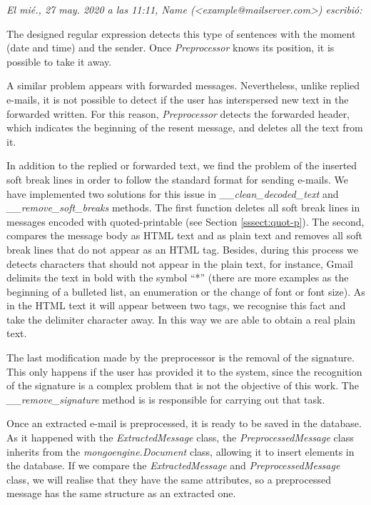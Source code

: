 \textit{El mié., 27 may. 2020 a las 11:11, Name (<example@mailserver.com>) escribió:}

The designed regular expression detects this type of sentences with the moment (date and time) and the sender. Once \textit{Preprocessor} knows its position, it is possible to take it away.

A similar problem appears with forwarded messages. Nevertheless, unlike replied e-mails, it is not possible to detect if the user has interspersed new text in the forwarded written. For this reason, \textit{Preprocessor} detects the forwarded header, which indicates the beginning of the resent message, and deletes all the text from it.

In addition to the replied or forwarded text, we find the problem of the inserted soft break lines in order to follow the standard format for sending e-mails. We have implemented two solutions for this issue in \textit{\_\_clean\_decoded\_text} and \textit{\_\_remove\_soft\_breaks} methods. The first function deletes all soft break lines in messages encoded with quoted-printable (see Section \ref{sssect:quot-p}). The second, compares the message body as HTML text and as plain text and removes all soft break lines that do not appear as an HTML tag. Besides, during this process we detects characters that should not appear in the plain text, for instance, Gmail delimits the text in bold with the symbol ``*'' (there are more examples as the beginning of a bulleted list, an enumeration or the change of font or font size). As in the HTML text it will appear between two tags, we recognise this fact and take the delimiter character away. In this way we are able to obtain a real plain text.

The last modification made by the preprocessor is the removal of the signature. This only happens if the user has provided it to the system, since the recognition of the signature is a complex problem that is not the objective of this work. The \textit{\_\_remove\_signature} method is is responsible for carrying out that task.

Once an extracted e-mail is preprocessed, it is ready to be saved in the database. As it happened with the \textit{ExtractedMessage} class, the \textit{PreprocessedMessage} class inherits from the \textit{mongoengine.Document} class, allowing it to insert elements in the database. If we compare the \textit{ExtractedMessage} and \textit{PreprocessedMessage} class, we will realise that they have the same attributes, so a preprocessed message has the same structure as an extracted one.